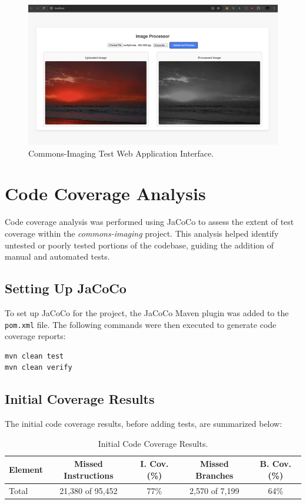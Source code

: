 \documentclass[a4paper,12pt]{report}
\begin{document}
\begin{figure}[H]
    \centering
    \includegraphics[width=1\textwidth]{Report_Img/localhost.png}
    \caption{Commons-Imaging Test Web Application Interface.}
    \label{fig:webapp_interface}
\end{figure}


\chapter{Code Coverage Analysis}
Code coverage analysis was performed using JaCoCo to assess the extent of test coverage within the \textit{commons-imaging} project. This analysis helped identify untested or poorly tested portions of the codebase, guiding the addition of manual and automated tests.

\section{Setting Up JaCoCo}
To set up JaCoCo for the project, the JaCoCo Maven plugin was added to the \texttt{pom.xml} file. The following commands were then executed to generate code coverage reports:

\begin{lstlisting}[language=bash, caption=Commands to Generate Code Coverage Reports]
mvn clean test
mvn clean verify
\end{lstlisting}

\section{Initial Coverage Results}
The initial code coverage results, before adding tests, are summarized below:

\begin{table}[H]
    \centering
    \begin{tabular}{|l|c|c|c|c|}
        \hline
        \textbf{Element} & \textbf{Missed Instructions} & \textbf{I. Cov. (\%)} & \textbf{Missed Branches} & \textbf{B. Cov. (\%)} \\ \hline
        Total & 21,380 of 95,452 & 77\% & 2,570 of 7,199 & 64\% \\ \hline
    \end{tabular}
    \caption{Initial Code Coverage Results.}
    \label{tab:initial_coverage}
\end{table}
\end{document}
